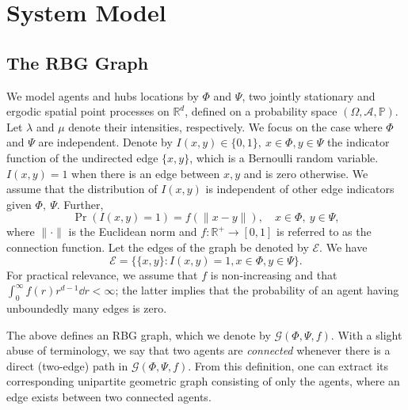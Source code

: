 \section{System Model}
\subsection{The RBG Graph}
We model agents and hubs locations by $\Phi$ and $\Psi$, two jointly stationary and ergodic spatial point processes on $\mathbb{R}^d$, defined on a probability space $(\Omega,\mathcal{A},\mathbb{P})$.
Let  $\lambda$ and $\mu$ denote their intensities, respectively. We focus on the case where $\Phi$ and $\Psi$ are independent. Denote by $I(x,y)\in\{0,1\},~x\in\Phi,y\in\Psi$ the  indicator function of the undirected edge $\{x,y\}$, which is a Bernoulli random variable. $I(x,y)=1$ when there is an edge between $x,y$ and is zero otherwise. We assume that the distribution of $I(x,y)$ is independent of other edge indicators given $\Phi,~\Psi$. Further,
\begin{equation}
    \Pr(I(x,y)=1) =  f(\|x-y\|),\quad x\in\Phi,~y\in\Psi,
\end{equation} where $\|\cdot\|$ is the Euclidean norm and $f\colon \mathbb{R}^+\to[0,1]$ is referred to as {the connection function}. Let the edges of the graph be denoted by $\mathcal{E}$. We have
\[\mathcal{E} = \{\{x,y\}: I(x,y)=1,x\in\Phi,y\in\Psi\}.\] For practical relevance, we assume that $f$ is non-increasing and that $\int_{0}^{\infty} f(r) r^{d-1}\dd r <\infty$; the latter implies that the probability of an agent having unboundedly many edges is zero. 

The above defines an RBG graph, which we denote by $\mathcal{G}(\Phi,\Psi, f)$. 
 With a slight abuse of terminology, we say that two agents are \textit{connected} whenever there is a direct (two-edge) path  in $\mathcal{G}(\Phi,\Psi, f)$. From this definition, one can extract its corresponding unipartite geometric graph consisting of only the agents, where an edge exists between two connected agents. 

